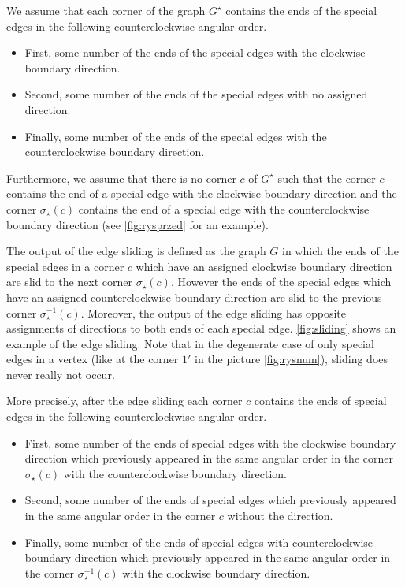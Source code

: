 \documentclass[submission]{FPSAC2021}
\DeclareMathOperator{\res}{\star}
\begin{document}
We assume that each corner of the 
graph $G^{\res}$ contains the ends 
of the special edges in the 
following counterclockwise angular 
order.  
\begin{itemize}

\item First, some number of the 
		ends of the special edges 
		with the clockwise 
		boundary direction.

\item Second, some number of the 
		ends of the special edges with 
		no assigned direction. 
\item Finally, some number of the
		ends of the special edges with 
		the counterclockwise 
		boundary direction. 
\end{itemize}  
Furthermore, we assume that there is no 
corner $c$ of $G^{\res}$ such that the corner 
$c$ contains the end of a special 
edge with the clockwise boundary direction and 
the corner $\sigma_{\res}(c)$ contains the end 
of a special edge with the  
counterclockwise boundary direction 
(see \cref{fig:rysprzed} for an example).

The output of the edge sliding is defined 
as the graph $G$ in which the ends of the 
special edges in a corner $c$ which have 
an assigned clockwise boundary direction 
are slid to the next corner $\sigma_{\res}(c)$. 
However the ends of the special edges which have 
an assigned counterclockwise boundary direction 
are slid to the previous corner $\sigma_{\res}^{-1}(c)$. 
Moreover, the output of the edge sliding
has opposite assignments of directions to
both ends of each special edge. \cref{fig:sliding} 
shows an example of the edge sliding. Note that 
in the degenerate case of only special edges in a vertex 
(like at the corner $1'$ in the picture \cref{fig:rysnum}), 
sliding does never really not occur.

More precisely, after the edge sliding each corner $c$ 
contains the ends of special edges in the following 
counterclockwise angular order.  
\begin{itemize}

\item First, some number of the ends 
		of special edges with the clockwise
		boundary direction which 
		previously appeared in the 
		same angular order in the corner 
		$\sigma_{\res}(c)$
		with the counterclockwise boundary
		direction.
\item Second, some number of the ends 
		of special edges which 
		previously appeared in the 
		same angular order in the corner $c$
		without the direction. 
\item Finally, some number of the ends 
		of special edges with counterclockwise 
		boundary direction which previously 
		appeared in the same angular order 
		in the corner $\sigma_{\res}^{-1}(c)$
		with the clockwise boundary direction.
\end{itemize}  
\end{document}
